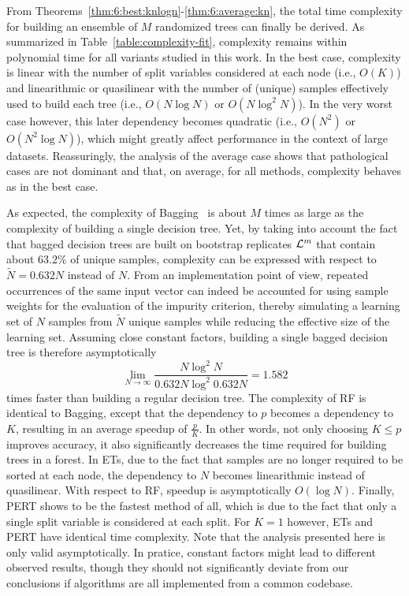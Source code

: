 From Theorems~\ref{thm:6:best:knlogn}-\ref{thm:6:average:kn}, the total time
complexity for building an ensemble of $M$ randomized trees can finally be
derived. As summarized in Table~\ref{table:complexity-fit}, complexity remains
within polynomial time for all variants studied in this work. In the best
case, complexity is linear with the number of split variables considered at
each node (i.e., $O(K)$) and linearithmic or quasilinear with the number of
(unique) samples effectively used to build each tree (i.e., $O(N\log N)$ or
$O(N\log^2 N)$). In the very worst case however, this later dependency becomes quadratic
(i.e., $O(N^2)$ or $O(N^2 \log N)$), which might greatly affect performance in
the context of large datasets. Reassuringly, the analysis of the average case
shows that pathological cases are not dominant and that, on average, for all methods, complexity
behaves as in the best case.

As expected, the complexity of Bagging~\citep{breiman:1996b} is about $M$ times
as large as the complexity of building a single decision tree. Yet, by taking
into account the fact that bagged decision trees are built on bootstrap
replicates ${\cal L}^m$ that contain about $63.2\%$ of unique samples,
complexity can be expressed with respect to $\widetilde{N} = 0.632 N$ instead
of $N$. From an implementation point of view, repeated occurrences of the same
input vector can indeed be accounted for using sample weights for the
evaluation of the impurity criterion, thereby  simulating a learning set of $N$
samples from $\widetilde{N}$ unique samples while reducing the effective size
of the learning set. Assuming close constant factors, building a single bagged
decision tree is therefore asymptotically
\begin{equation}
\lim_{N\to \infty} \frac{N\log^2 N}{0.632N \log^2 0.632N} = 1.582
\end{equation}
times faster than building a regular decision tree. The complexity of RF is
identical to Bagging, except that the dependency
to $p$ becomes a dependency to $K$, resulting in an average speedup of
$\tfrac{p}{K}$. In other words, not only choosing $K \leq p$ improves accuracy,
it also significantly decreases the time required for building trees in a
forest. In ETs, due to the fact that
samples are no longer required to be sorted at each node, the dependency to $N$
becomes linearithmic instead of quasilinear. With respect to RF,
speedup is asymptotically $O(\log N)$.
Finally, PERT shows to be the fastest
method of all, which is due to the fact that only a single split variable
is considered at each split. For $K=1$ however, ETs and PERT have identical
time complexity. Note that the analysis presented here is only valid
asymptotically. In pratice, constant factors might lead to different
observed results, though they should not significantly deviate  from our conclusions if
algorithms are all implemented from a common codebase.

